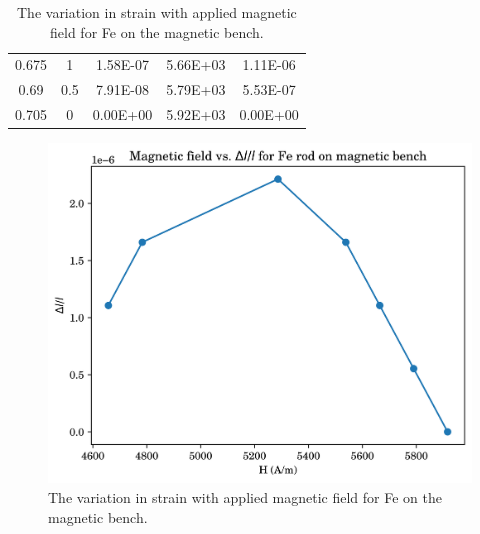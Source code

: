 \begin{table}[h!]
{\begin{tabular}{@{}ccccc@{}}
			0.675                                                                 & 1                                                                   & 1.58E-07                                                                                & 5.66E+03                                                   & 1.11E-06                                                                                  \\
			0.69                                                                  & 0.5                                                                 & 7.91E-08                                                                                & 5.79E+03                                                   & 5.53E-07                                                                                  \\
			0.705                                                                 & 0                                                                   & 0.00E+00                                                                                & 5.92E+03                                                   & 0.00E+00                                                                                  \\ \bottomrule
		\end{tabular}
	}
	\caption{The variation in strain with applied magnetic field for Fe on the magnetic bench.}
	\label{tab:mb-Fe}
\end{table}
\begin{figure}
	\centering
	\includegraphics{data/mb-Fe-1}
	\caption{The variation in strain with applied magnetic field for Fe on the magnetic bench.}
	\label{fig:mb-fe-1}
\end{figure}

